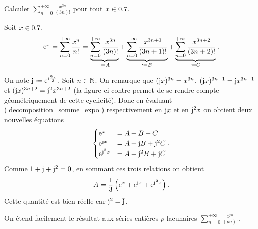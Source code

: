 \begin{exercice}
Calculer $\sum\limits_{n=0}^{+ \infty} \frac{x^{3n}}{(3n)!}$ pour tout $x \in 0.7$.
\end{exercice}

\begin{solution}
Soit $x \in 0.7$. 
\begin{align} \label{decomposition_somme_expo}
    \me^x = \sum_{n=0}^{+ \infty} \frac{x^n}{n!} = \underbrace{\sum_{n=0}^{+ \infty} \frac{x^{3n}}{(3n)!}}_{ \defeq A} + \underbrace{\sum_{n=0}^{+ \infty} \frac{x^{3n+1}}{(3n+1)!}}_{\defeq B} + \underbrace{\sum_{n=0}^{+ \infty} \frac{x^{3n+2}}{(3n+2)!}}_{\defeq C}.
\end{align}

\begin{marginfigure}
    
\end{marginfigure}

On note $\mj \defeq \me^{\mi \frac{2\pi}{3}}$. Soit $n \in \mathbb{N}$. On remarque que $(\mathrm{j} x)^{3n} = x^{3n}$, $(\mathrm{j} x)^{3n+1} = \mathrm{j} x^{3n+1}$ et $(\mathrm{j} x)^{3n+2} = \mathrm{j}^2 x^{3n+2}$ (la figure ci-contre permet de se rendre compte géométriquement de cette cyclicité). Donc en évaluant (\ref{decomposition_somme_expo}) respectivement en $\mathrm{j} x$ et en $\mathrm{j}^2 x$ on obtient deux nouvelles équations
$$\begin{cases}
    \mathrm{e}^x &= A + B + C \\
    \mathrm{e}^{\mathrm{j} x} &= A + \mathrm{j} B + \mathrm{j}^2 C \\
    \mathrm{e}^{\mathrm{j}^2 x} &= A + \mathrm{j}^2 B + \mathrm{j} C
\end{cases}.$$
Comme $1 + \mathrm{j} + \mathrm{j}^2 = 0$, en sommant ces trois relations on obtient
$$A = \frac{1}{3} \left(\mathrm{e}^x + \mathrm{e}^{\mathrm{j} x}+ \mathrm{e}^{\mathrm{j}^2 x} \right).$$
Cette quantité est bien réelle car $\mathrm{j}^2 = \overline{\mathrm{j}}$.
\end{solution}

\begin{remarque}
    On étend facilement le résultat aux séries entières $p$-lacunaires $\sum\limits_{n=0}^{+ \infty} \frac{x^{pn}}{(pn)!}$.
\end{remarque}